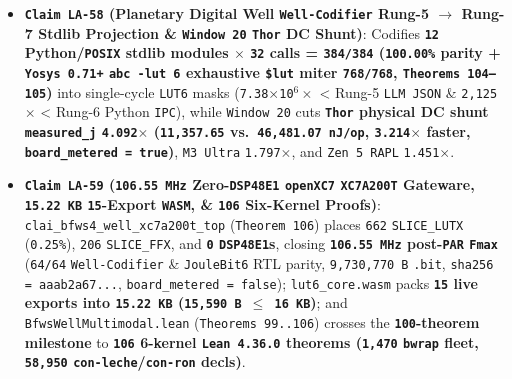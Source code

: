 \documentclass[10pt]{article}
\begin{document}
\begin{itemize}
  \item \textbf{\texttt{Claim LA-58} (Planetary Digital Well \texttt{Well-Codifier} Rung-5 $\to$ Rung-7 Stdlib Projection \& \texttt{Window 20} \texttt{Thor} DC Shunt)}: Codifies \textbf{\texttt{12} Python/\texttt{POSIX} stdlib modules $\times$ \texttt{32} calls = \texttt{384/384} (\texttt{100.00\%} parity + \texttt{Yosys 0.71+} \texttt{abc -lut 6} exhaustive \texttt{\$lut} miter \texttt{768/768}, \texttt{Theorems 104--105})} into single-cycle \texttt{LUT6} masks (\texttt{7.38$\times$10$^6\times$} < Rung-5 \texttt{LLM JSON} \& \texttt{2,125$\times$} < Rung-6 Python \texttt{IPC}), while \texttt{Window 20} cuts \textbf{\texttt{Thor} physical DC shunt \texttt{measured\_j} \texttt{4.092$\times$} (\texttt{11,357.65} vs.\ \texttt{46,481.07 nJ/op}, \texttt{3.214$\times$} faster, \texttt{board\_metered = true})}, \texttt{M3 Ultra} \texttt{1.797$\times$}, and \texttt{Zen 5 RAPL} \texttt{1.451$\times$}.
  \item \textbf{\texttt{Claim LA-59} (\texttt{106.55 MHz} Zero-\texttt{DSP48E1} \texttt{openXC7} \texttt{XC7A200T} Gateware, \texttt{15.22 KB} \texttt{15}-Export \texttt{WASM}, \& \texttt{106} Six-Kernel Proofs)}: \texttt{clai\_bfws4\_well\_xc7a200t\_top} (\texttt{Theorem 106}) places \texttt{662} \texttt{SLICE\_LUTX} (\texttt{0.25\%}), \texttt{206} \texttt{SLICE\_FFX}, and \textbf{\texttt{0} \texttt{DSP48E1}s}, closing \textbf{\texttt{106.55 MHz} post-\texttt{PAR} \texttt{Fmax}} (\texttt{64/64} \texttt{Well-Codifier} \& \texttt{JouleBit6} RTL parity, \texttt{9,730,770 B} \texttt{.bit}, \texttt{sha256 = aaab2a67...}, \texttt{board\_metered = false}); \texttt{lut6\_core.wasm} packs \textbf{\texttt{15} live exports into \texttt{15.22 KB} (\texttt{15,590 B $\le$ 16 KB})}; and \texttt{BfwsWellMultimodal.lean} (\texttt{Theorems 99..106}) crosses the \textbf{\texttt{100}-theorem milestone} to \textbf{\texttt{106} 6-kernel \texttt{Lean 4.36.0} theorems (\texttt{1,470} \texttt{bwrap} fleet, \texttt{58,950} \texttt{con-leche}/\texttt{con-ron} decls)}.
\end{itemize}
\end{document}
